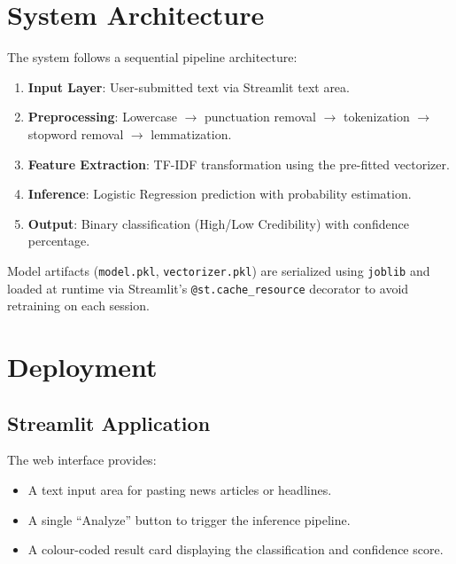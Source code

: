 \documentclass[12pt, a4paper]{article}
\begin{document}
\section{System Architecture}

The system follows a sequential pipeline architecture:

\begin{enumerate}[nosep]
    \item \textbf{Input Layer}: User-submitted text via Streamlit text area.
    \item \textbf{Preprocessing}: Lowercase $\rightarrow$ punctuation removal $\rightarrow$ tokenization $\rightarrow$ stopword removal $\rightarrow$ lemmatization.
    \item \textbf{Feature Extraction}: TF-IDF transformation using the pre-fitted vectorizer.
    \item \textbf{Inference}: Logistic Regression prediction with probability estimation.
    \item \textbf{Output}: Binary classification (High/Low Credibility) with confidence percentage.
\end{enumerate}

Model artifacts (\texttt{model.pkl}, \texttt{vectorizer.pkl}) are serialized using \texttt{joblib} and loaded at runtime via Streamlit's \texttt{@st.cache\_resource} decorator to avoid retraining on each session.

\section{Deployment}

\subsection{Streamlit Application}
The web interface provides:
\begin{itemize}[nosep]
    \item A text input area for pasting news articles or headlines.
    \item A single ``Analyze'' button to trigger the inference pipeline.
    \item A colour-coded result card displaying the classification and confidence score.
\end{itemize}
\end{document}
